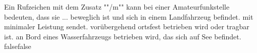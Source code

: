    {Ein Rufzeichen mit dem Zusatz ""/m"" kann bei einer Amateurfunkstelle bedeuten, dass sie ...}
    {beweglich ist und sich in einem Landfahrzeug befindet.}
    {mit minimaler Leistung sendet.}
    {vorübergehend ortsfest betrieben wird oder tragbar ist.}
    {an Bord eines Wasserfahrzeugs betrieben wird, das sich auf See befindet.}
    {false}{false}